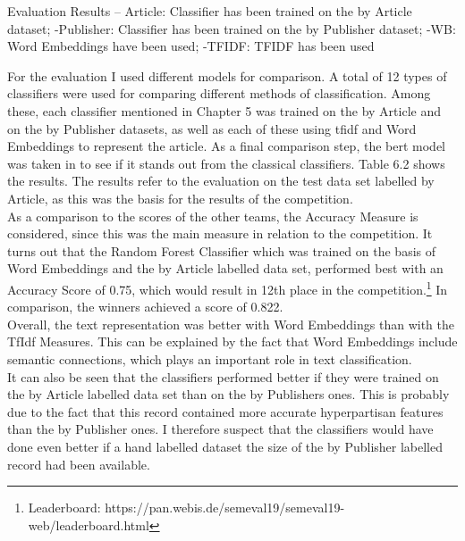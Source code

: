 \documentclass[a4paper, 11pt,titlepage,oneside,openany]{book}
\begin{document}
\begin{table}[h]
	\caption{Evaluation Results -- Article: Classifier has been trained on the by Article dataset; -Publisher: Classifier has been trained on the by Publisher dataset; -WB: Word Embeddings have been used; -TFIDF: TFIDF has been used}
\end{table}
For the evaluation I used different models for comparison. A total of 12 types of classifiers were used for comparing different methods of classification. Among these, each classifier mentioned in Chapter 5 was trained on the by Article and on the by Publisher datasets, as well as each of these using \gls{tfidf} and Word Embeddings to represent the article. As a final comparison step, the \gls{bert} model was taken in to see if it stands out from the classical classifiers. Table 6.2 shows the results. The results refer to the evaluation on the test data set labelled by Article, as this was the basis for the results of the competition. \\
\indent As a comparison to the scores of the other teams, the Accuracy Measure is considered, since this was the main measure in relation to the competition. It turns out that the Random Forest Classifier which was trained on the basis of Word Embeddings and the by Article labelled data set, performed best with an Accuracy Score of 0.75, which would result in 12th place in the competition.\footnote{Leaderboard: https://pan.webis.de/semeval19/semeval19-web/leaderboard.html} In comparison, the winners achieved a score of 0.822.\\
\indent Overall, the text representation was better with Word Embeddings than with the TfIdf Measures. This can be explained by the fact that Word Embeddings include semantic connections, which plays an important role in text classification. \\
\indent It can also be seen that the classifiers performed better if they were trained on the by Article labelled data set than on the by Publishers ones. This is probably due to the fact that this record contained more accurate hyperpartisan features than the by Publisher ones. I therefore suspect that the classifiers would have done even better if a hand labelled dataset the size of the by Publisher labelled record had been available. 
\end{document}
